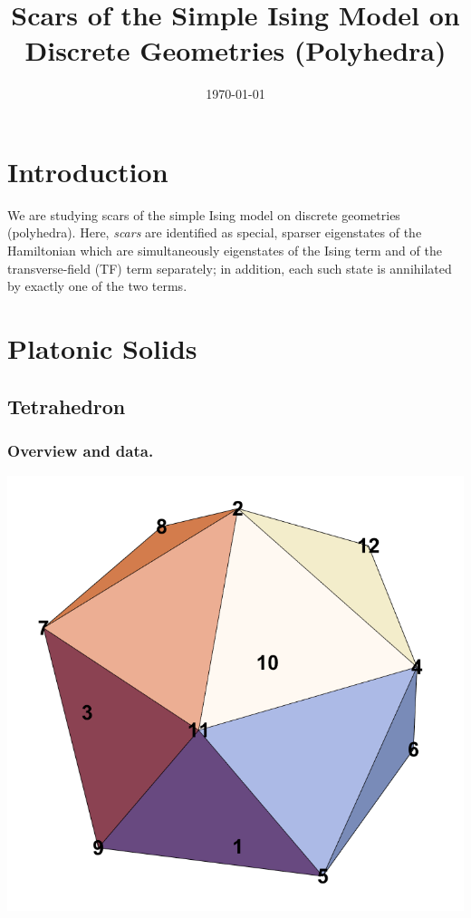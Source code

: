 \documentclass[11pt,a4paper]{article}
\title{Scars of the Simple Ising Model on Discrete Geometries (Polyhedra)}
\author{}
\date{\today}
\begin{document}
\maketitle

\section*{Introduction}
We are studying scars of the simple Ising model on discrete geometries (polyhedra). Here, \emph{scars} are identified as special, sparser eigenstates of the Hamiltonian which are simultaneously eigenstates of the Ising term and of the transverse-field (TF) term separately; in addition, each such state is annihilated by exactly one of the two terms.

\section*{Platonic Solids}

\subsection*{Tetrahedron}

\subsubsection*{Overview and data.}
\begin{center}
  \includegraphics[width=.6\linewidth]{icosahedron}
\end{center}
\end{document}
